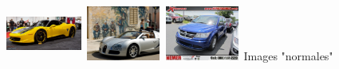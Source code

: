 \documentclass{beamer}
\begin{document}
\begin{frame}
\begin{columns}
			\centering
			\begin{figure}
				\includegraphics[width=2.5cm,height=1.8cm]{../rapports/images/images_anomalies/inlier-4}
				\includegraphics[width=2.5cm,height=1.8cm]{../rapports/images/images_anomalies/inlier-5}
				\includegraphics[width=2.5cm,height=1.8cm]{../rapports/images/images_anomalies/inlier-6}
				{\footnotesize Images "normales"}
			\end{figure}
		\end{columns}
	\end{frame}
	
\end{document}
